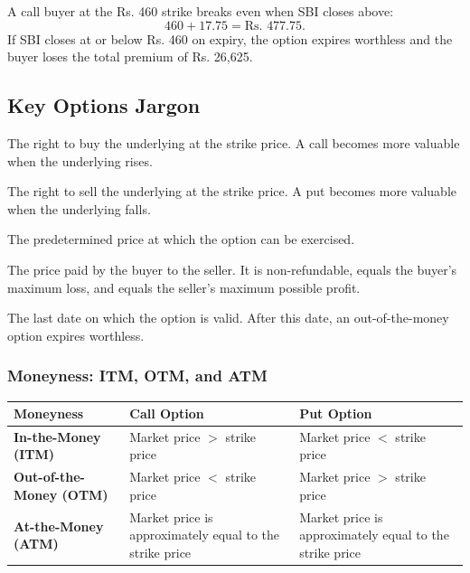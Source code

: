 \documentclass[12pt,openany]{book}
\begin{document}
A call buyer at the Rs. 460 strike breaks even when SBI closes above:
\begin{equation*}
    460 + 17.75 = \text{Rs. }477.75.
\end{equation*}
If SBI closes at or below Rs. 460 on expiry, the option expires worthless and the buyer loses the total premium of Rs. 26,625.

\subsection{Key Options Jargon}

\begin{description}[leftmargin=!,labelwidth=4cm]
    \item[Call Option] The right to buy the underlying at the strike price. A call becomes more valuable when the underlying rises.
    \item[Put Option] The right to sell the underlying at the strike price. A put becomes more valuable when the underlying falls.
    \item[Strike Price] The predetermined price at which the option can be exercised.
    \item[Premium] The price paid by the buyer to the seller. It is non-refundable, equals the buyer's maximum loss, and equals the seller's maximum possible profit.
    \item[Expiration Date] The last date on which the option is valid. After this date, an out-of-the-money option expires worthless.
\end{description}

\subsubsection{Moneyness: ITM, OTM, and ATM}

\begin{center}
\small
\begin{tabular}{|L{3.4cm}|L{5cm}|L{5cm}|}
\hline
\textbf{Moneyness} & \textbf{Call Option} & \textbf{Put Option} \\
\hline
\textbf{In-the-Money (ITM)} & Market price \(>\) strike price & Market price \(<\) strike price \\
\hline
\textbf{Out-of-the-Money (OTM)} & Market price \(<\) strike price & Market price \(>\) strike price \\
\hline
\textbf{At-the-Money (ATM)} & Market price is approximately equal to the strike price & Market price is approximately equal to the strike price \\
\hline
\end{tabular}
\end{center}
\end{document}
